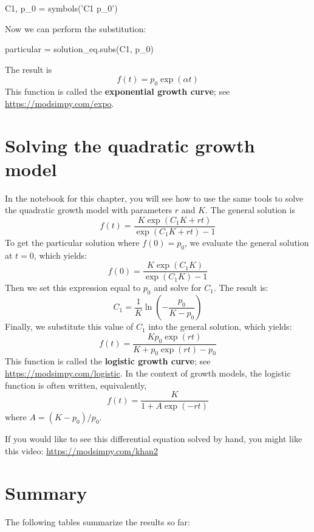 \documentclass[12pt]{book}
\theoremstyle{exercise}
\begin{document}

\begin{python}
C1, p_0 = symbols('C1 p_0')
\end{python}

Now we can perform the substitution:

\begin{python}
particular = solution_eq.subs(C1, p_0)
\end{python}

The result is 
%
\[ f{\left (t \right )} = p_{0} \exp(\alpha t) \]
%
This function is called the {\bf exponential growth curve}; see \url{https://modsimpy.com/expo}.



\section{Solving the quadratic growth model}

In the notebook for this chapter, you will see how to use the same tools to solve the quadratic growth model with parameters $r$ and $K$.  The general solution is
%
\[ f{\left (t \right )} = \frac{K \exp(C_{1} K + r t)}{\exp(C_{1} K + r t) - 1} \]
%
To get the particular solution where $f(0) = p_0$, we evaluate the general solution at $t=0$, which yields:
%
\[ f(0) = \frac{K \exp(C_{1} K)}{\exp(C_{1} K) - 1} \]
%
Then we set this expression equal to $p_0$ and solve for $C_1$.  The result is:
%
\[ C_1 = \frac{1}{K} \ln{\left (- \frac{p_{0}}{K - p_{0}} \right )} \]
%
Finally, we substitute this value of $C_1$ into the general solution, which yields:
%
\[ f(t) = \frac{K p_{0} \exp(r t)}{K + p_{0} \exp(r t) - p_{0}} \]
%
This function is called the {\bf logistic growth curve}; see \url{https://modsimpy.com/logistic}.  In the context of growth models, the logistic function is often written, equivalently,
%
\[ f(t) = \frac{K}{1 + A \exp(-rt)} \]
%
where $A = (K - p_0) / p_0$.

If you would like to see this differential equation solved by hand, you might like this video: \url{https://modsimpy.com/khan2}


\section{Summary}

The following tables summarize the results so far:
\end{document}
